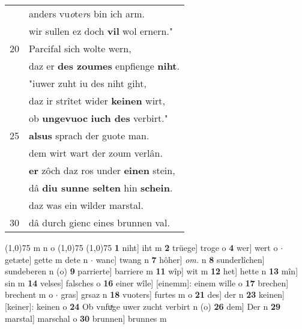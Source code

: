 \documentclass[8pt,a4paper,notitlepage]{article}
\begin{document}
\begin{table}[ht]
\begin{minipage}[t]{0.5\linewidth}
\begin{tabular}{rl}
 & anders vu\textit{o}te\textit{r}s bin ich arm.\\ 
 & wir sullen ez doch \textbf{vil} wol ernern."\\ 
20 & Parcifal sich wolte wern,\\ 
 & daz er \textbf{des zoumes} enpfienge \textbf{niht}.\\ 
 & "iuwer zuht iu des niht giht,\\ 
 & daz ir strîtet wider \textbf{keinen} wirt,\\ 
 & ob \textbf{ungevuoc} \textbf{iuch des} verbirt."\\ 
25 & \textbf{alsus} sprach der guote man.\\ 
 & dem wirt wart der zoum verlân.\\ 
 & \textbf{er} zôch daz ros under \textbf{einen} stein,\\ 
 & dâ \textbf{diu sunne selten} hin \textbf{schein}.\\ 
 & daz was ein wilder marstal.\\ 
30 & dâ durch gienc eines brunnen val.\\ 
\end{tabular}
\scriptsize
\line(1,0){75} \newline
m n o \newline
\line(1,0){75} \newline
\newline
\line(1,0){75} \newline
\textbf{1} niht] iht m \textbf{2} trüege] troge o \textbf{4} wer] wert o  $\cdot$ getæte] gette m dete n  $\cdot$ wanc] twang n \textbf{7} hôher] \textit{om.} n \textbf{8} sunderlîchen] sundeberen n (o) \textbf{9} parrierte] barriere m \textbf{11} wîp] wit m \textbf{12} het] hette n \textbf{13} mîn] sin m \textbf{14} velses] falsches o \textbf{16} einer wîle] [einemm]: einem wille o \textbf{17} brechen] brechent m o  $\cdot$ gras] grsaz n \textbf{18} vuoters] furtes m o \textbf{21} des] der n \textbf{23} keinen] [keiner]: keinen o \textbf{24} Ob vnfuͯge uwer zucht verbirt n (o) \textbf{26} dem] Der n \textbf{29} marstal] marschal o \textbf{30} brunnen] brunnes m \newline
\end{minipage}
\end{table}
\newpage
\end{document}
